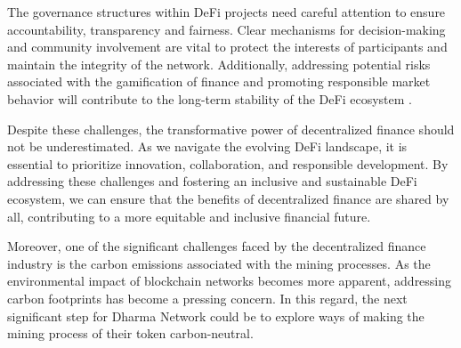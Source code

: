 The governance structures within DeFi projects need careful attention to ensure accountability, transparency and fairness. Clear mechanisms for decision-making and community involvement are vital to protect the interests of participants and maintain the integrity of the network. Additionally, addressing potential risks associated with the gamification of finance and promoting responsible market behavior will contribute to the long-term stability of the DeFi ecosystem \cite{oecd}.\newline

Despite these challenges, the transformative power of decentralized finance should not be underestimated. As we navigate the evolving DeFi landscape, it is essential to prioritize innovation, collaboration, and responsible development. By addressing these challenges and fostering an inclusive and sustainable DeFi ecosystem, we can ensure that the benefits of decentralized finance are shared by all, contributing to a more equitable and inclusive financial future.\newline


\begin{comment}
    However, challenges remain. Technological barriers, regulatory frameworks and infrastructure limitations, such as poor or no access to the Internet, must be addressed to ensure widespread adoption and inclusivity. Moreover, efforts must be made to bridge the digital divide and provide education and awareness about DeFi to underserved communities. Collaboration between governments, financial institutions and technology innovators is crucial to harness the full potential of decentralized finance in tackling global income inequality.

Decentralized finance and cryptocurrencies have the potential to reshape the global financial landscape and address the persistent issue of income inequality. By providing accessible, transparent, and inclusive financial services, DeFi can empower individuals and communities that have been historically marginalized. While challenges exist, the transformative power of decentralized finance should not be underestimated. As we navigate this evolving landscape, it is essential to prioritize innovation, collaboration, and responsible development to ensure that the benefits of DeFi are shared by all.
\end{comment}

Moreover, one of the significant challenges faced by the decentralized finance industry is the carbon emissions associated with the mining processes. As the environmental impact of blockchain networks becomes more apparent, addressing carbon footprints has become a pressing concern. In this regard, the next significant step for Dharma Network could be to explore ways of making the mining process of their token carbon-neutral.\newline

